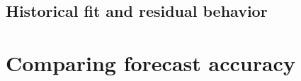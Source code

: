                                                                                                                                                                                                                                                                                                                                                                     
\subsection{Historical fit and residual behavior}
\begin{table}[H]\centering\small
\caption{                                                                                             }\label{tab:fit}

\end{table}
                                                                                                                                                                                                                                                                                                                                                 
\section{Comparing forecast accuracy}\label{sec:validation}
                                                                                                                                                                                                                                                                                                                                                                                                                                                                                              
                                                                                                                                                                                                                                                                                                                                                                                                                                                                                                                                                

